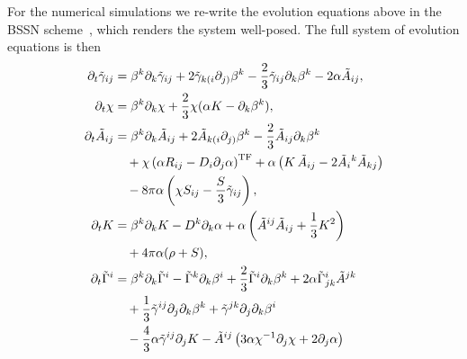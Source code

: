 For the numerical simulations we re-write the evolution equations above in the BSSN scheme~\cite{Scalar_ScalarBase_Shibata:1995we,Scalar_ScalarBase_Baumgarte:1998te}, which renders the system well-posed.
The full system of evolution equations is then
\begin{subequations}
  \allowdisplaybreaks
  \label{eq:bssn}
  \begin{align}
    \partial_t \tilde{\gamma}_{ij} & = \beta^k \partial_k \tilde{\gamma}_{ij} +
    2\tilde{\gamma}_{k(i} \partial_{j)} \beta^k - \frac{2}{3}
    \tilde{\gamma}_{ij} \partial_k \beta^k -2\alpha \tilde{A}_{ij},  \\
    \partial_t \chi & = \beta^k \partial_k \chi + \frac{2}{3} \chi (\alpha K
    - \partial_k \beta^k),  \\
    \partial_t \tilde{A}_{ij} & = \beta^k \partial_k \tilde{A}_{ij}
      + 2\tilde{A}_{k(i} \partial_{j)} \beta^k
      - \frac{2}{3} \tilde{A}_{ij} \partial_k \beta^k  \notag \\
      & \quad + \chi \left( \alpha R_{ij} - D_i \partial_j \alpha\right)^{\rm
      TF}
      + \alpha \left( K\,\tilde{A}_{ij}
      - 2 \tilde{A}_i{}^k \tilde{A}_{kj} \right) \notag \\
      & \quad - 8 \pi \alpha \left(
          \chi S_{ij} - \frac{S}{3} \tilde \gamma_{ij}
        \right), \\
    \partial_t K & = \beta^k \partial_k K - D^k \partial_k \alpha + \alpha \left(
                   \tilde{A}^{ij} \tilde{A}_{ij} + \frac{1}{3} K^2 \right) \notag \\
    & \quad  + 4 \pi \alpha (\rho + S), \\
    \partial_t \tilde{\Gamma}^i & = \beta^k \partial_k \tilde{\Gamma}^i
       - \tilde{\Gamma}^k \partial_k \beta^i + \frac{2}{3}
    \tilde{\Gamma}^i \partial_k \beta^k + 2 \alpha \tilde{\Gamma}^i_{jk}
                                  \tilde{A}^{jk} \notag \\
                                  & \quad + \frac{1}{3} \tilde{\gamma}^{ij}\partial_j \partial_k
    \beta^k
    + \tilde{\gamma}^{jk} \partial_j \partial_k \beta^i \nonumber \\
    & \quad - \frac{4}{3} \alpha \tilde{\gamma}^{ij} \partial_j K -
    \tilde{A}^{ij} \left( 3 \alpha \chi^{-1} \partial_j \chi + 2\partial_j
      \alpha \right) %

\end{align}
\end{subequations}
